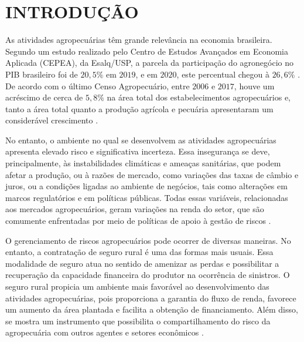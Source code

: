 \section{INTRODUÇÃO}

As atividades agropecuárias têm grande relevância na economia brasileira. Segundo um estudo realizado pelo Centro de Estudos Avançados em Economia Aplicada (CEPEA), da Esalq/USP, a parcela da participação do agronegócio no PIB brasileiro foi de $20,5\%$ em $2019$, e em $2020$, este percentual chegou à $26,6\%$ \cite{cepea21_2}. De acordo com o último Censo Agropecuário, entre $2006$ e $2017$, houve um acréscimo de cerca de $5,8\%$ na área total dos estabelecimentos agropecuários e, tanto a área total quanto a produção agrícola e pecuária apresentaram um considerável crescimento \cite{ibge19_2}.

No entanto, o ambiente no qual se desenvolvem as atividades agropecuárias apresenta elevado risco e significativa incerteza. Essa insegurança se deve, principalmente, às instabilidades climáticas e ameaças sanitárias, que podem afetar a produção, ou à razões de mercado, como variações das taxas de câmbio e juros, ou a condições ligadas ao ambiente de negócios, tais como alterações em marcos regulatórios e em políticas públicas. Todas essas variáveis, relacionadas aos mercados agropecuários, geram variações na renda do setor, que são comumente enfrentadas por meio de políticas de apoio à gestão de riscos \cite{brasil18_2}.

O gerenciamento de riscos agropecuários pode ocorrer de diversas maneiras. No entanto, a contratação de seguro rural é uma das formas mais usuais. Essa modalidade de seguro atua no sentido de amenizar as perdas e possibilitar a recuperação da capacidade financeira do produtor na ocorrência de sinistros. O seguro rural propicia um ambiente mais favorável ao desenvolvimento das atividades agropecuárias, pois proporciona a garantia do fluxo de renda, favorece um aumento da área plantada e facilita a obtenção de financiamento. Além disso, se mostra um instrumento que possibilita o compartilhamento do risco da agropecuária com outros agentes e setores econômicos \cite{brasil19_2}.


